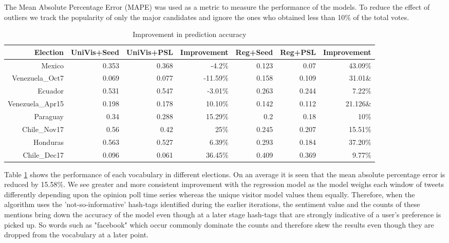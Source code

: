 The Mean Absolute Percentage Error (MAPE) was used as a metric to measure the performance of the models. 
To reduce the effect of outliers we track the popularity of only the major candidates and ignore the ones who obtained less than 10\% of the total votes.
\begin{table}
	\centering
	\begin{tabular}{| r || r | r | r | r | r | r |}
 	\hline
 	Election & UniVis+Seed & UniVis+PSL & Improvement & Reg+Seed & Reg+PSL & Improvement\\
 	\hline
	Mexico & 0.353 & 0.368 & -4.2\% & 0.123 & 0.07 & 43.09\% \\ 	
 	Venezuela\_Oct7 & 0.069	& 0.077 & -11.59\% & 0.158 & 0.109 & 31.01\&\\
	Ecuador & 0.531 & 0.547 & -3.01\% & 0.263 & 0.244 & 7.22\% \\
	Venezuela\_Apr15 & 0.198 & 0.178 & 10.10\% & 0.142 & 0.112 & 21.126\&\\
	Paraguay & 0.34 & 0.288 & 15.29\% & 0.2 & 0.18 & 10\% \\
	Chile\_Nov17 & 0.56 & 0.42 & 25\% & 0.245 & 0.207 & 15.51\% \\
	Honduras & 0.563 & 0.527 & 6.39\% & 0.293 & 0.184 & 37.20\% \\
	Chile\_Dec17 & 0.096 & 0.061 & 36.45\% & 0.409 & 0.369 & 9.77\% \\
 	\hline
	\end{tabular}
	\caption{Improvement in prediction accuracy}
	\label{table:improvement}
\end{table}	
Table \ref{table:improvement} shows the performance of each vocabulary in different elections. 
On an average it is seen that the mean absolute percentage error is reduced by 15.58\%.
We see greater and more consistent improvement with the regression model as the model weighs each window of tweets differently depending upon the opinion poll time series whereas the unique visitor model values them equally. 
Therefore, when the algorithm uses the 'not-so-informative' hash-tags identified during the earlier iterations, the sentiment value and the counts of these mentions bring down the accuracy of the model even though at a later stage hash-tags that are strongly indicative of a user's preference is picked up.
So words such as "facebook" which occur commonly dominate the counts and therefore skew the results even though they are dropped from the vocabulary at a later point.